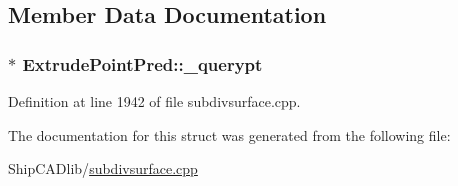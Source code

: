 \subsection{Member Data Documentation}
\hypertarget{structExtrudePointPred_af9fa40238ef74aca6b8f8d7e303aafb4}{
\subsubsection[{\-\_\-querypt}]{$\ast$ Extrude\-Point\-Pred\-::\-\_\-querypt}}\label{structExtrudePointPred_af9fa40238ef74aca6b8f8d7e303aafb4}


Definition at line 1942 of file subdivsurface.\-cpp.



The documentation for this struct was generated from the following file\-:\begin{DoxyCompactItemize}
\item 
Ship\-C\-A\-Dlib/\hyperlink{subdivsurface_8cpp}{subdivsurface.\-cpp}\end{DoxyCompactItemize}
